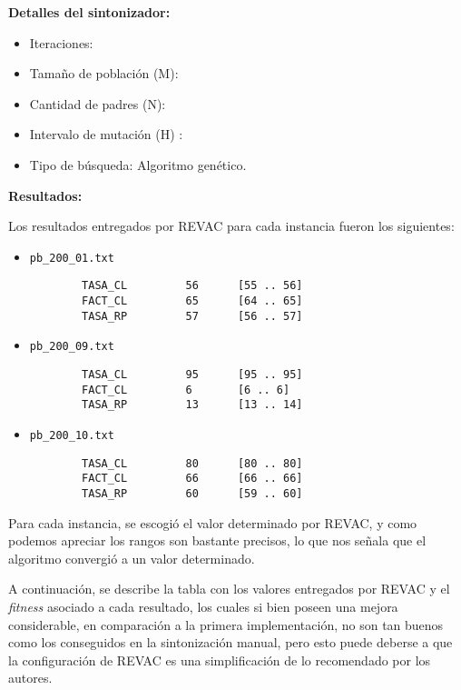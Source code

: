\textbf{Detalles del sintonizador:}\\

\begin{itemize}
	\item Iteraciones: 
	\item Tamaño de población (M): 
	\item Cantidad de padres (N): 
	\item Intervalo de mutación (H) : 
	\item Tipo de búsqueda: Algoritmo genético.
\end{itemize}

\textbf{Resultados:}

Los resultados entregados por REVAC para cada instancia fueron los siguientes:

\begin{itemize}
	\item \texttt{pb\_200\_01.txt}\\

		\begin{verbatim}
        TASA_CL         56      [55 .. 56]
        FACT_CL         65      [64 .. 65]
        TASA_RP         57      [56 .. 57]
		\end{verbatim}
	\item \texttt{pb\_200\_09.txt}\\

		\begin{verbatim}
        TASA_CL         95      [95 .. 95]
        FACT_CL         6       [6 .. 6]
        TASA_RP         13      [13 .. 14]
		\end{verbatim}

	\item \texttt{pb\_200\_10.txt}\\

		\begin{verbatim}
        TASA_CL         80      [80 .. 80]
        FACT_CL         66      [66 .. 66]
        TASA_RP         60      [59 .. 60]
		\end{verbatim}

\end{itemize}

Para cada instancia, se escogió el valor determinado por REVAC,
y como podemos apreciar los rangos son bastante precisos, lo que nos señala
que el algoritmo convergió a un valor determinado.

A continuación, se describe la tabla con los valores entregados
por REVAC y el \emph{fitness} asociado a cada resultado, los cuales
si bien poseen una mejora considerable, en comparación a la primera implementación,
no son tan buenos como los conseguidos en la sintonización manual,
pero esto puede deberse a que la configuración de REVAC es una simplificación de
lo recomendado por los autores.


